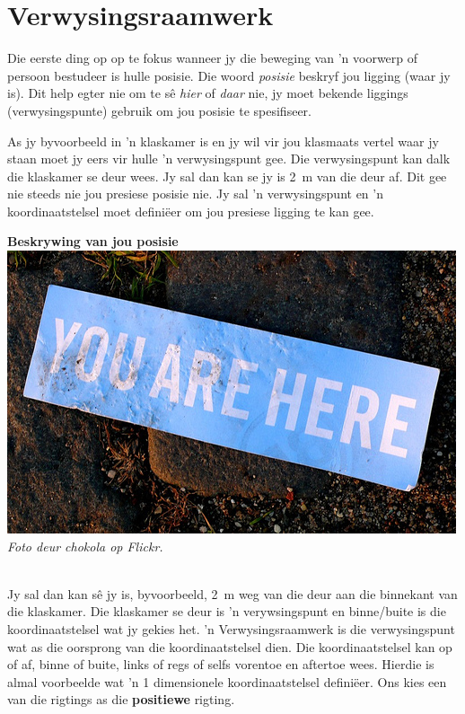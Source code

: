 

\section{Verwysingsraamwerk}
Die eerste ding op op te fokus wanneer jy die beweging van 'n voorwerp of persoon bestudeer is hulle posisie. Die woord \textsl{posisie} beskryf jou ligging (waar jy is). Dit help egter nie om te s\^e \textsl{hier} of \textsl{daar} nie, jy moet bekende liggings (verwysingspunte) gebruik om jou posisie te spesifiseer.

\begin{minipage}{.35\textwidth}
As jy byvoorbeeld in 'n klaskamer is en jy wil vir jou klasmaats vertel waar jy staan moet jy eers vir hulle 'n verwysingspunt gee. Die verwysingspunt kan dalk die klaskamer se deur wees. Jy sal dan kan se jy is 2~m van die deur af. Dit gee nie steeds nie jou presiese posisie nie. Jy sal 'n verwysingspunt en 'n koordinaatstelsel moet defini\"eer om jou presiese ligging te kan gee.
\end{minipage}
\begin{minipage}{.6\textwidth}
\begin{center}
\textbf{Beskrywing van jou posisie}\\
 \includegraphics[width=.8\textwidth]{photos/youarehereby_chokola_flickr.jpg}\\
\textit{Foto deur chokola op Flickr.}
\end{center}
\end{minipage}\\
Jy sal dan kan s\^e jy is, byvoorbeeld, 2~m weg van die deur aan die binnekant van die klaskamer. Die klaskamer se deur is 'n verywsingspunt en binne/buite is die koordinaatstelsel wat jy gekies het. 'n Verwysingsraamwerk is die verwysingspunt wat as die oorsprong van die koordinaatstelsel dien. Die koordinaatstelsel kan op of af, binne of buite, links of regs of selfs vorentoe en aftertoe wees. Hierdie is almal voorbeelde wat 'n 1 dimensionele koordinaatstelsel defini\"eer. Ons kies een van die rigtings as die \textbf{positiewe} rigting.

